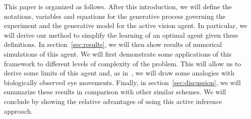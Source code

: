 \CNS
This paper is organized as follows. After this introduction, we will define the notations, variables and equations for the generative process governing the experiment and the generative model for the active vision agent. In particular, we will derive our method to simplify the learning of an optimal agent given these definitions. In section~\ref{sec:results}, we will then show results of numerical simulations of this agent. We will first demonstrate some applications of this framework to different levels of complexity of the problem. This will allow us to derive some limits of this agent and, as in~\citep{Najemnik05}, we will draw some analogies with biologically observed eye movements. Finally, in section~\ref{sec:discussion}, we will summarize these results in comparison with other similar schemes. We will conclude by showing the relative advantages of using this active inference approach.
\fi